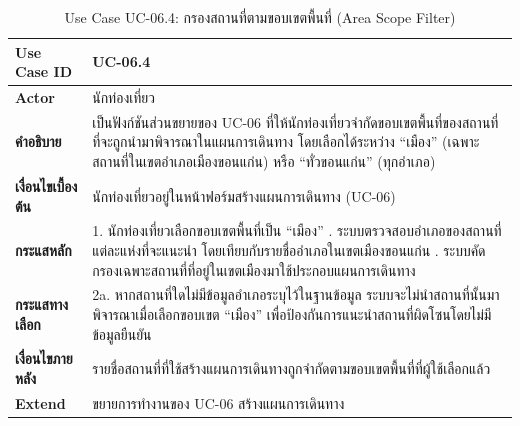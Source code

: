 \begin{table}[H]
\centering
\caption{Use Case UC-06.4: กรองสถานที่ตามขอบเขตพื้นที่ (Area Scope Filter)}
\label{tab:uc06area}
\begin{tabular}{|p{3.2cm}|p{10cm}|}
\hline
\textbf{Use Case ID} & UC-06.4 \\ \hline
\textbf{Actor} & นักท่องเที่ยว \\ \hline
\textbf{คำอธิบาย} & เป็นฟังก์ชันส่วนขยายของ UC-06 ที่ให้นักท่องเที่ยวจำกัดขอบเขตพื้นที่ของสถานที่ที่จะถูกนำมาพิจารณาในแผนการเดินทาง โดยเลือกได้ระหว่าง ``เมือง'' (เฉพาะสถานที่ในเขตอำเภอเมืองขอนแก่น) หรือ ``ทั่วขอนแก่น'' (ทุกอำเภอ) \\ \hline
\textbf{เงื่อนไขเบื้องต้น} & นักท่องเที่ยวอยู่ในหน้าฟอร์มสร้างแผนการเดินทาง (UC-06) \\ \hline
\textbf{กระแสหลัก} & 1. นักท่องเที่ยวเลือกขอบเขตพื้นที่เป็น ``เมือง'' \newline 2. ระบบตรวจสอบอำเภอของสถานที่แต่ละแห่งที่จะแนะนำ โดยเทียบกับรายชื่ออำเภอในเขตเมืองขอนแก่น \newline 3. ระบบคัดกรองเฉพาะสถานที่ที่อยู่ในเขตเมืองมาใช้ประกอบแผนการเดินทาง \\ \hline
\textbf{กระแสทางเลือก} & 2a. หากสถานที่ใดไม่มีข้อมูลอำเภอระบุไว้ในฐานข้อมูล ระบบจะไม่นำสถานที่นั้นมาพิจารณาเมื่อเลือกขอบเขต ``เมือง'' เพื่อป้องกันการแนะนำสถานที่ผิดโซนโดยไม่มีข้อมูลยืนยัน \\ \hline
\textbf{เงื่อนไขภายหลัง} & รายชื่อสถานที่ที่ใช้สร้างแผนการเดินทางถูกจำกัดตามขอบเขตพื้นที่ที่ผู้ใช้เลือกแล้ว \\ \hline
\textbf{Extend} & ขยายการทำงานของ UC-06 สร้างแผนการเดินทาง \\
\hline
\end{tabular}
\end{table}

